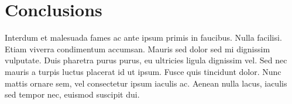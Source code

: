 \documentclass{acm_proc_article-sp}
\begin{document}
\section{Conclusions}

Interdum et malesuada fames ac ante ipsum primis in faucibus. Nulla facilisi.
Etiam viverra condimentum accumsan. Mauris sed dolor sed mi dignissim
vulputate. Duis \cite{clark:pct} pharetra purus purus, eu ultricies ligula
dignissim vel. Sed nec mauris a turpis luctus placerat id ut ipsum. Fusce quis
tincidunt dolor.  Nunc mattis ornare sem, vel consectetur ipsum iaculis ac.
Aenean nulla lacus, iaculis sed tempor nec, euismod suscipit dui.



\end{document}
